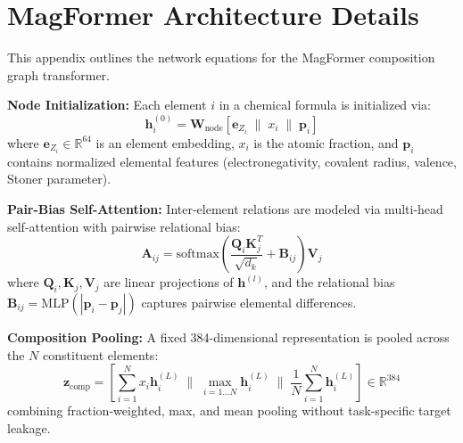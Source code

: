 \documentclass[11pt,a4paper]{article}
\begin{document}
\vspace{0.4cm}
\section{MagFormer Architecture Details}
\label{sec:appendix_magformer}

This appendix outlines the network equations for the MagFormer composition graph transformer.

\vspace{0.2cm}
\noindent\textbf{Node Initialization:} Each element $i$ in a chemical formula is initialized via:
\begin{equation}
    \mathbf{h}_i^{(0)} = \mathbf{W}_{\text{node}} \left[ \mathbf{e}_{Z_i} \;\parallel\; x_i \;\parallel\; \mathbf{p}_i \right]
\end{equation}
where $\mathbf{e}_{Z_i} \in \mathbb{R}^{64}$ is an element embedding, $x_i$ is the atomic fraction, and $\mathbf{p}_i$ contains normalized elemental features (electronegativity, covalent radius, valence, Stoner parameter).

\vspace{0.2cm}
\noindent\textbf{Pair-Bias Self-Attention:} Inter-element relations are modeled via multi-head self-attention with pairwise relational bias:
\begin{equation}
    \mathbf{A}_{ij} = \text{softmax} \left( \frac{\mathbf{Q}_i \mathbf{K}_j^T}{\sqrt{d_k}} + \mathbf{B}_{ij} \right) \mathbf{V}_j
\end{equation}
where $\mathbf{Q}_i, \mathbf{K}_j, \mathbf{V}_j$ are linear projections of $\mathbf{h}^{(l)}$, and the relational bias $\mathbf{B}_{ij} = \text{MLP}(|\mathbf{p}_i - \mathbf{p}_j|)$ captures pairwise elemental differences.

\vspace{0.2cm}
\noindent\textbf{Composition Pooling:} A fixed 384-dimensional representation is pooled across the $N$ constituent elements:
\begin{equation}
    \mathbf{z}_{\text{comp}} = \left[ \sum_{i=1}^N x_i \mathbf{h}_i^{(L)} \;\parallel\; \max_{i=1 \dots N} \mathbf{h}_i^{(L)} \;\parallel\; \frac{1}{N}\sum_{i=1}^N \mathbf{h}_i^{(L)} \right] \in \mathbb{R}^{384}
\end{equation}
combining fraction-weighted, max, and mean pooling without task-specific target leakage.
\end{document}
